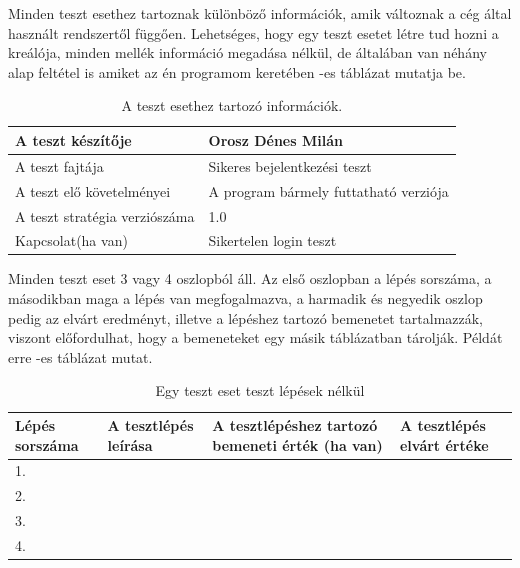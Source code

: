 Minden teszt esethez tartoznak különböző információk, amik változnak a cég által használt rendszertől függően. Lehetséges, hogy egy teszt esetet létre tud hozni a kreálója, minden mellék információ megadása nélkül, de általában van néhány alap feltétel is amiket az én programom keretében -es táblázat mutatja be.\\

\label {table:template}
\label {table:testcase}
\label {table:successcase}
\label {table:addnode}
\label {table:jtree}
\label {table:ekvivalencia}
\label {table:kombináció}

\label {tab:console}
\label {tab:modify}
\label {tab:program}
\label {tab:tree}
\label {tab:login}

\begin{table} [h]
	\begin{center}
		\begin{tabular}{ | p{6cm} | p{6cm}| } 
			\hline
			A teszt készítője & Orosz Dénes Milán  \\ 
			\hline
			A teszt fajtája & Sikeres bejelentkezési teszt  \\ 
			\hline
			A teszt elő követelményei & A program bármely futtatható verziója  \\ 
			\hline
			A teszt stratégia verziószáma & 1.0 \\
			\hline
			Kapcsolat(ha van) & Sikertelen login teszt \\
			\hline
		\end{tabular}
	\label{tab:template}
	\caption{A teszt esethez tartozó információk.}
	\end{center}

\end{table}
Minden teszt eset 3 vagy 4 oszlopból áll. Az első oszlopban a lépés sorszáma, a másodikban  maga a lépés van megfogalmazva, a harmadik és negyedik oszlop pedig az elvárt eredményt, illetve a lépéshez tartozó bemenetet tartalmazzák, viszont előfordulhat, hogy a bemeneteket egy másik táblázatban tárolják. Példát erre  -es táblázat mutat.\\

\begin{table}[h]
\begin{center}
	\resizebox{\textwidth}{!} {
\begin{tabular}{ |p{3cm}|p{5cm}|p{5cm}|p{5cm}|} 
	\hline
	 Lépés sorszáma & A tesztlépés leírása & A tesztlépéshez tartozó bemeneti érték (ha van) & A tesztlépés elvárt értéke  \\ 
	\hline
	1. & & &  \\ 
	\hline
	2. & & &  \\ 
	\hline
	3. & & & \\
	\hline
	4. & & & \\
	\hline
\end{tabular}
}
\end{center}
	\caption{Egy teszt eset teszt lépések nélkül}
	\label{table:testcase}
\end{table}

